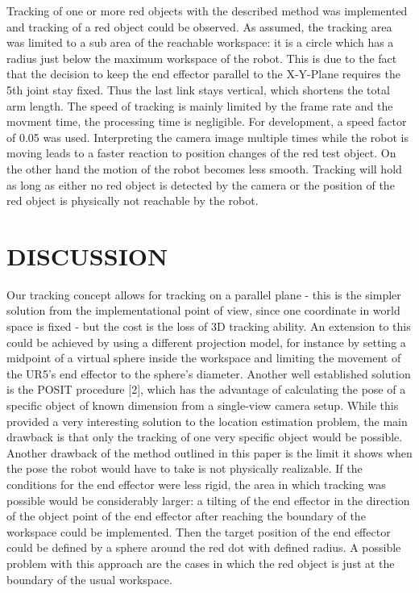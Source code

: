 \documentclass[letterpaper, 10 pt, conference]{IEEEconf}  %
\begin{document}
Tracking of one or more red objects with the described method was implemented and tracking of a red object could be observed. As assumed, the tracking area was limited to a sub area of the reachable workspace: it is a circle which has a radius just below the maximum workspace of the robot. This is due to the fact that the decision to keep the end effector parallel to the X-Y-Plane requires the 5th joint stay fixed. Thus the last link stays vertical, which shortens the total arm length. The speed of tracking is mainly limited by the frame rate and the movment time, the processing time is negligible. For development, a speed factor of 0.05 was used. Interpreting the camera image multiple times while the robot is moving leads to a faster reaction to position changes of the red test object. On the other hand the motion of the robot becomes less smooth. Tracking will hold as long as either no red object is detected by the camera or the position of the red object is physically not reachable by the robot. 
\section{DISCUSSION}
Our tracking concept allows for tracking on a parallel plane - this is  the simpler solution from the implementational point of view, since one coordinate in world space is fixed - but the cost is the loss of 3D tracking ability. An extension to this could be achieved by using a different projection model, for instance by setting a midpoint of a virtual sphere inside the workspace and limiting the movement of the UR5's end effector to the sphere's diameter. Another well established solution is the POSIT procedure [2], which has the advantage of calculating the pose of a specific object of known dimension from a single-view camera setup. While this provided a very interesting solution to the location estimation problem, the main drawback is that only the tracking of one very specific object would be possible.\\Another drawback of the method outlined in this paper is the limit it shows when the pose the robot would have to take is not physically realizable. If the conditions for the end effector were less rigid, the area in which tracking was possible would be considerably larger: a tilting of the end effector in the direction of the object point of the end effector after reaching the boundary of the workspace could be implemented. Then the target position of the end effector could be defined by a sphere around the red dot with defined radius. A possible problem with this approach are the cases in which the red object is just at the boundary of the usual workspace.
\end{document}
